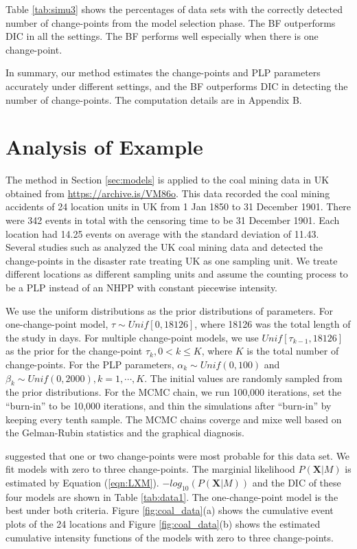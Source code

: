 \documentclass[12pt]{article}
\numberwithin{equation}{section}
\begin{document}
Table \ref{tab:simu3} shows the percentages of data sets with the correctly detected number of change-points from the model selection phase. The BF outperforms DIC in all the settings. The BF performs well especially when there is one change-point. 

In summary, our method estimates the change-points and PLP parameters accurately under different settings, and the BF outperforms DIC in detecting the number of change-points. The computation details are in Appendix B. 
\section{Analysis of Example}\label{sec:data_analysis}
The method in Section \ref{sec:models} is applied to the coal mining data in UK obtained from \url{https://archive.is/VM86o}. This data recorded the coal mining accidents of 24 location units in UK from 1 Jan 1850 to 31 December 1901. There were 342 events in total with the censoring time to be 31 December 1901. Each location had 14.25 events on average with the standard deviation of 11.43. Several studies such as \citet{Raftery1986, Carlin1992, Green1995} analyzed the UK coal mining data and detected the change-points in the disaster rate treating UK as one sampling unit.  We treate different locations as different sampling units and assume the counting process to be a PLP instead of an NHPP with constant piecewise intensity. 

We use the uniform distributions as the prior distributions of parameters. For one-change-point model, $\tau\sim Unif[0, 18126]$, where 18126 was the total length of the study in days. For multiple change-point models, we use $Unif[\tau_{k-1}, 18126]$ as the prior for the change-point $\tau_{k}, 0<k\leq K$, where $K$ is the total number of change-points. For the PLP parameters, $\alpha_k\sim Unif(0, 100)$ and $\beta_k \sim Unif(0, 2000), k = 1, \cdots, K$.  The initial values are randomly sampled from the prior distributions. For the MCMC chain, we run 100,000 iterations, set the ``burn-in'' to be 10,000 iterations, and thin the simulations after ``burn-in'' by keeping every tenth sample. The MCMC chains coverge and mixe well based on the Gelman-Rubin statistics and the graphical diagnosis. 

\citet{Ruggeri2005} suggested that one or two change-points were most probable for this data set. We fit models with zero to three change-points. The marginial likelihood $P(\pmb X|M)$ is estimated by Equation (\ref{eqn:LXM}). $-log_{10}(P(\pmb X|M))$ and the DIC of these four models are shown in Table \ref{tab:data1}. The one-change-point model is the best under both criteria. Figure \ref{fig:coal_data}(a) shows the cumulative event plots of the 24 locations and Figure \ref{fig:coal_data}(b) shows the estimated cumulative intensity functions of the models with zero to three change-points.
\end{document}
